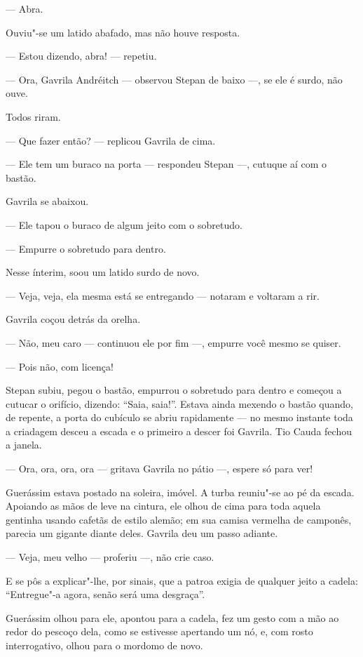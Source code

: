 --- Abra.

Ouviu"-se um latido abafado, mas não houve resposta.

--- Estou dizendo, abra! --- repetiu.

--- Ora, Gavrila Andréitch --- observou Stepan de baixo ---, se ele é
surdo, não ouve.

Todos riram.

--- Que fazer então? --- replicou Gavrila de cima.

--- Ele tem um buraco na porta --- respondeu Stepan ---, cutuque aí com
o bastão.

Gavrila se abaixou.

--- Ele tapou o buraco de algum jeito com o sobretudo.

--- Empurre o sobretudo para dentro.

Nesse ínterim, soou um latido surdo de novo.

--- Veja, veja, ela mesma está se entregando --- notaram e voltaram a
rir.

Gavrila coçou detrás da orelha.

--- Não, meu caro --- continuou ele por fim ---, empurre você mesmo se
quiser.

--- Pois não, com licença!

Stepan subiu, pegou o bastão, empurrou o sobretudo para dentro e começou
a cutucar o orifício, dizendo: ``Saia, saia!''. Estava ainda mexendo o
bastão quando, de repente, a porta do cubículo se abriu rapidamente ---
no mesmo instante toda a criadagem desceu a escada e o primeiro a descer
foi Gavrila. Tio Cauda fechou a janela.

--- Ora, ora, ora, ora --- gritava Gavrila no pátio ---, espere só para
ver!

Guerássim estava postado na soleira, imóvel. A turba reuniu"-se ao pé da
escada. Apoiando as mãos de leve na cintura, ele olhou de cima para toda
aquela gentinha usando cafetãs de estilo alemão; em sua camisa vermelha
de camponês, parecia um gigante diante deles. Gavrila deu um passo
adiante.

--- Veja, meu velho --- proferiu ---, não crie caso.

E se pôs a explicar"-lhe, por sinais, que a patroa exigia de qualquer
jeito a cadela: ``Entregue"-a agora, senão será uma desgraça''.

Guerássim olhou para ele, apontou para a cadela, fez um gesto com a mão
ao redor do pescoço dela, como se estivesse apertando um nó, e, com
rosto interrogativo, olhou para o mordomo de novo.

